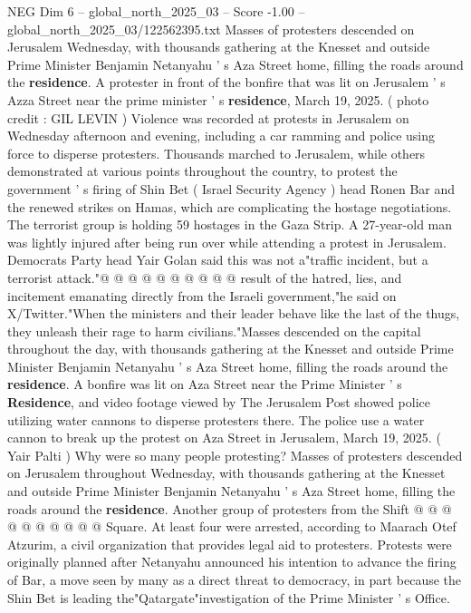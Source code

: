 \begin{textsample}{NEG Dim 6 – global\_north\_2025\_03 – Score -1.00 – global\_north\_2025\_03/122562395.txt}  \label{ex:f6_neg_236}
Masses of protesters descended on Jerusalem Wednesday, with thousands gathering at the Knesset and outside Prime Minister Benjamin Netanyahu ' s Aza Street home, filling the roads around the \textbf{residence}.
A protester in front of the bonfire that was lit on Jerusalem ' s Azza Street near the prime minister ' s \textbf{residence}, March 19, 2025. ( photo credit : GIL LEVIN ) Violence was recorded at protests in Jerusalem on Wednesday afternoon and evening, including a car ramming and police using force to disperse protesters.
Thousands marched to Jerusalem, while others demonstrated at various points throughout the country, to protest the government ' s firing of Shin Bet ( Israel Security Agency ) head Ronen Bar and the renewed strikes on Hamas, which are complicating the hostage negotiations.
The terrorist group is holding 59 hostages in the Gaza Strip.
A 27-year-old man was lightly injured after being run over while attending a protest in Jerusalem.
Democrats Party head Yair Golan said this was not a"traffic incident, but a terrorist attack."@ @ @ @ @ @ @ @ @ @ result of the hatred, lies, and incitement emanating directly from the Israeli government,"he said on X/Twitter."When the ministers and their leader behave like the last of the thugs, they unleash their rage to harm civilians."Masses descended on the capital throughout the day, with thousands gathering at the Knesset and outside Prime Minister Benjamin Netanyahu ' s Aza Street home, filling the roads around the \textbf{residence}.
A bonfire was lit on Aza Street near the Prime Minister ' s \textbf{Residence}, and video footage viewed by The Jerusalem Post showed police utilizing water cannons to disperse protesters there.
The police use a water cannon to break up the protest on Aza Street in Jerusalem, March 19, 2025. ( Yair Palti ) Why were so many people protesting?
Masses of protesters descended on Jerusalem throughout Wednesday, with thousands gathering at the Knesset and outside Prime Minister Benjamin Netanyahu ' s Aza Street home, filling the roads around the \textbf{residence}.
Another group of protesters from the Shift @ @ @ @ @ @ @ @ @ @ Square.
At least four were arrested, according to Maarach Otef Atzurim, a civil organization that provides legal aid to protesters.
Protests were originally planned after Netanyahu announced his intention to advance the firing of Bar, a move seen by many as a direct threat to democracy, in part because the Shin Bet is leading the"Qatargate"investigation of the Prime Minister ' s Office.

\end{textsample}
